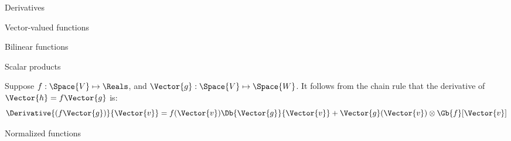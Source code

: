 \begin{plSection}{Derivatives}
\begin{plSection}{Vector-valued functions}
\begin{plSection}{Bilinear functions}
\begin{plSection}{Cross products}
{\end{plSection}%
\end{plSection}%
\begin{plSection}{Scalar products}
\label{sec:Derivatives-of-scalar-products}

Suppose
$f:\Space{V} \mapsto \Reals$, and
$\Vector{g}:\Space{V} \mapsto \Space{W}$.
It follows from the chain rule that the derivative of $\Vector{h} = f\Vector{g}$ is:
\begin{equation}
\label{eq:scalar_product_derivative}
\Derivative{(f\Vector{g})}{\Vector{v}} =  f(\Vector{v}) \Db{\Vector{g}}{\Vector{v}} + \Vector{g}(\Vector{v}) \otimes \Gb{f}[\Vector{v}]
\end{equation}

\end{plSection}%
\begin{plSection}{Normalized functions}
\label{sec:Derivatives-of-normalized-functionss}


\end{plSection}
\end{plSection}
\end{plSection}
